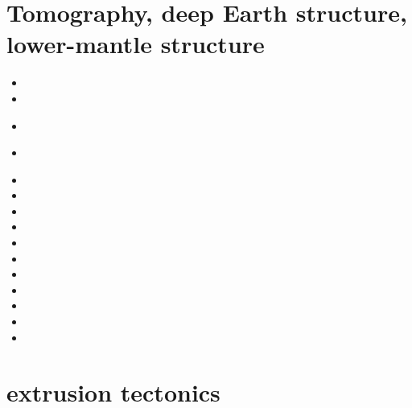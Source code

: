 \section{Tomography, deep Earth structure, lower-mantle structure}
\begin{small}
\begin{itemize}
\item[\nineteeneightyone] 
\item[\nineteenninetyone] 
\item[\nineteenninetythree] 
 \\ 
\item[\nineteenninetyeight] 
 \\
\item[\twothousandtwo] 
\item[\twothousandthree] 
\item[\twothousandnine] 
\item[\twothousandten] 
\item[\twothousandeleven]
\item[\twothousandtwelve]
\item[\twothousandthirteen] 
\item[\twothousandsixteen] 
\item[\twothousandeighteen] 
\item[\twothousandtwenty] 
\item[\twothousandtwentythree] 
\end{itemize}
\end{small}


\section{extrusion tectonics}


